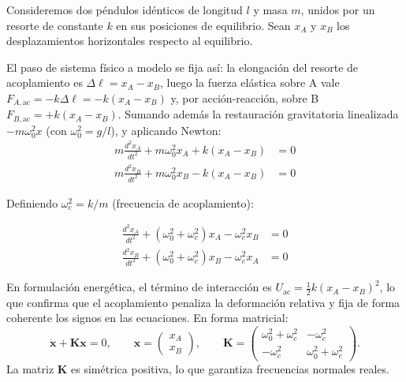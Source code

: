 \documentclass[12pt, a4paper]{article}
\theoremstyle{plain}
\theoremstyle{definition}
\theoremstyle{remark}
\begin{document}
Consideremos dos péndulos idénticos de longitud $l$ y masa $m$, unidos por un resorte
de constante $k$ en sus posiciones de equilibrio. Sean $x_A$ y $x_B$ los desplazamientos
horizontales respecto al equilibrio.

El paso de sistema físico a modelo se fija así: la elongación del resorte de acoplamiento
es $\Delta\ell=x_A-x_B$, luego la fuerza elástica sobre A vale
$F_{A,\text{ac}}=-k\Delta\ell=-k(x_A-x_B)$ y, por acción-reacción, sobre B
$F_{B,\text{ac}}=+k(x_A-x_B)$. Sumando además la restauración gravitatoria linealizada
$-m\omega_0^2x$ (con $\omega_0^2=g/l$), y aplicando Newton:
\begin{align}
  m\frac{d^2x_A}{dt^2} + m\omega_0^2 x_A + k(x_A - x_B) &= 0 \\
  m\frac{d^2x_B}{dt^2} + m\omega_0^2 x_B - k(x_A - x_B) &= 0
\end{align}

Definiendo $\omega_c^2 = k/m$ (frecuencia de acoplamiento):
\begin{mdframed}[style=resultado]
\begin{align}
  \frac{d^2x_A}{dt^2} + (\omega_0^2+\omega_c^2)x_A - \omega_c^2 x_B &= 0 \\
  \frac{d^2x_B}{dt^2} + (\omega_0^2+\omega_c^2)x_B - \omega_c^2 x_A &= 0
\end{align}
\end{mdframed}
En formulación energética, el término de interacción es
$U_{\text{ac}}=\tfrac12k(x_A-x_B)^2$, lo que confirma que el acoplamiento penaliza la
deformación relativa y fija de forma coherente los signos en las ecuaciones.
En forma matricial:
\begin{equation}
  \ddot{\mathbf{x}}+\mathbf{K}\mathbf{x}=0,\qquad
  \mathbf{x}=\begin{pmatrix}x_A\\x_B\end{pmatrix},\qquad
  \mathbf{K}=
  \begin{pmatrix}
    \omega_0^2+\omega_c^2 & -\omega_c^2\\
    -\omega_c^2 & \omega_0^2+\omega_c^2
  \end{pmatrix}.
\end{equation}
La matriz $\mathbf{K}$ es simétrica positiva, lo que garantiza frecuencias normales reales.
\end{document}
